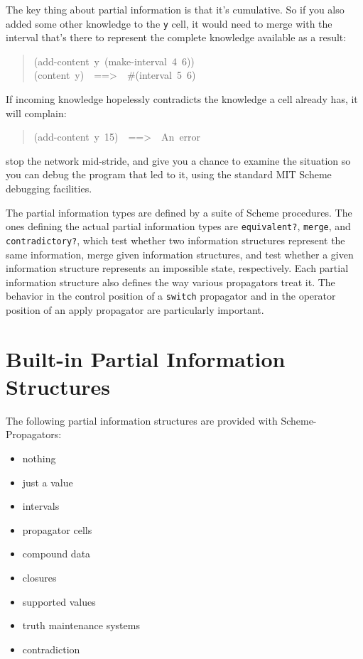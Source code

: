 \documentclass[12pt,letterpaper,english]{article}
\begin{document}
The key thing about partial information is that it's
cumulative.  So if you also added some other knowledge to the \texttt{y}
cell, it would need to merge with the interval that's there to
represent the complete knowledge available as a result:
\begin{quote}{\ttfamily \raggedright \noindent
(add-content~y~(make-interval~4~6))~\\
(content~y)~~==>~~{\#}(interval~5~6)
}\end{quote}

If incoming knowledge hopelessly contradicts the knowledge a cell
already has, it will complain:
\begin{quote}{\ttfamily \raggedright \noindent
(add-content~y~15)~~==>~~An~error
}\end{quote}
stop the network mid-stride, and give you a chance to examine the
situation so you can debug the program that led to it, using the
standard MIT Scheme debugging facilities.

The partial information types are defined by a suite of Scheme
procedures.  The ones defining the actual partial information types
are \texttt{equivalent?}, \texttt{merge}, and \texttt{contradictory?}, which test
whether two information structures represent the same information,
merge given information structures, and test whether a given
information structure represents an impossible state, respectively.
Each partial information structure also defines the way various
propagators treat it.  The behavior in the control position of a
\texttt{switch} propagator and in the operator position of an apply
propagator are particularly important.



\section{Built-in Partial Information Structures}
\label{built-in-partial-information-structures}

The following partial information structures are provided with
Scheme-Propagators:
\begin{itemize}
\item {} 
nothing

\item {} 
just a value

\item {} 
intervals

\item {} 
propagator cells

\item {} 
compound data

\item {} 
closures

\item {} 
supported values

\item {} 
truth maintenance systems

\item {} 
contradiction

\end{itemize}
\end{document}

